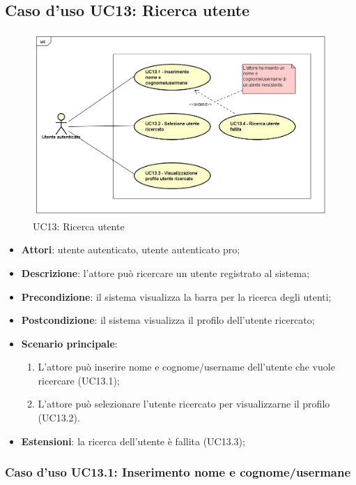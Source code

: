 \newpage
\subsection{Caso d'uso UC13: Ricerca utente}
\label{UC13}
\begin{figure}[h]
	\centering
	\includegraphics[scale=0.5]{UML/UC13.png}
	\caption{UC13: Ricerca utente}
\end{figure}
\FloatBarrier
\begin{itemize}
	\item \textbf{Attori}: utente autenticato, utente autenticato pro;
	\item \textbf{Descrizione}: l'attore può ricercare un utente registrato al sistema;
	\item \textbf{Precondizione}: il sistema visualizza la barra per la ricerca degli utenti;
	\item \textbf{Postcondizione}: il sistema visualizza il profilo dell'utente ricercato;
	\item \textbf{Scenario principale}:
	\begin{enumerate}
		\item L'attore può inserire nome e cognome/username dell'utente che vuole ricercare (UC13.1);
		\item L'attore può selezionare l'utente ricercato per visualizzarne il profilo (UC13.2).
	\end{enumerate} 
	\item \textbf{Estensioni}: la ricerca dell'utente è fallita (UC13.3);
\end{itemize}

\subsubsection{Caso d'uso UC13.1: Inserimento nome e cognome/usermane}

